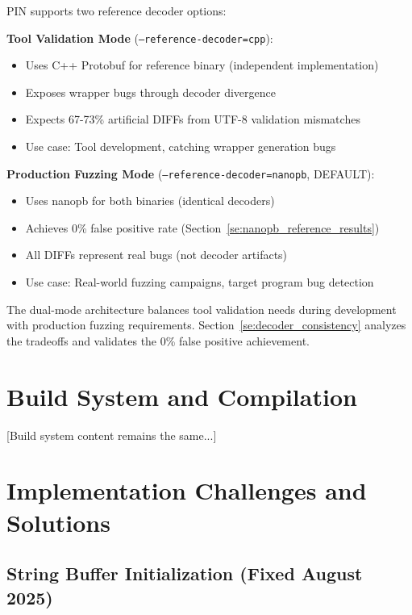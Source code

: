 \documentclass[doublespace,nopageskip]{VTthesis}
\begin{document}
  PIN supports two reference decoder options:

  \textbf{Tool Validation Mode} (\texttt{--reference-decoder=cpp}):
  \begin{itemize}
      \item Uses C++ Protobuf for reference binary (independent implementation)
      \item Exposes wrapper bugs through decoder divergence
      \item Expects 67-73\% artificial DIFFs from UTF-8 validation mismatches
      \item Use case: Tool development, catching wrapper generation bugs
  \end{itemize}

  \textbf{Production Fuzzing Mode} (\texttt{--reference-decoder=nanopb}, DEFAULT):
  \begin{itemize}
      \item Uses nanopb for both binaries (identical decoders)
      \item Achieves 0\% false positive rate (Section~\ref{se:nanopb_reference_results})
      \item All DIFFs represent real bugs (not decoder artifacts)
      \item Use case: Real-world fuzzing campaigns, target program bug detection
  \end{itemize}

  The dual-mode architecture balances tool validation needs during development with production fuzzing requirements. Section~\ref{se:decoder_consistency} analyzes the tradeoffs and validates the 0\% false positive achievement.

  \section{Build System and Compilation} \label{se:build_system}

  [Build system content remains the same...]

  \section{Implementation Challenges and Solutions} \label{se:implementation_challenges}

  \subsection{String Buffer Initialization (Fixed August 2025)}
\end{document}

